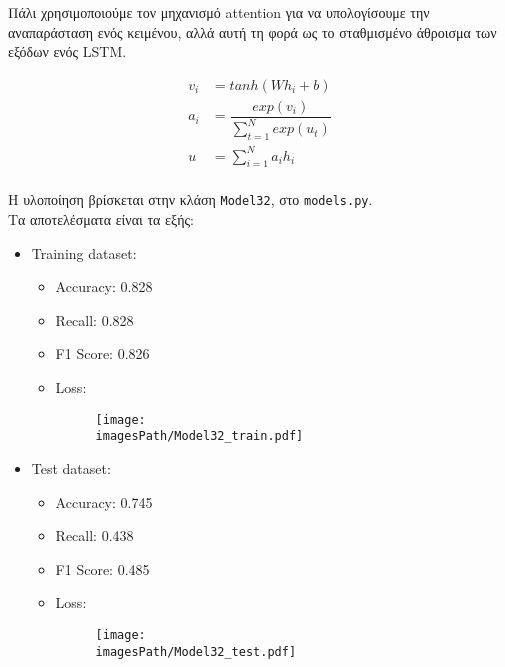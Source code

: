 \documentclass[a4paper, 12pt]{article}
\newcommand{\imagesPath}{results}
\newcommand{\myWidth}{0.8\linewidth}
\begin{document}
        Πάλι χρησιμοποιούμε τον μηχανισμό attention για να υπολογίσουμε την αναπαράσταση ενός κειμένου, αλλά αυτή τη φορά ως το σταθμισμένο άθροισμα των εξόδων ενός LSTM.
        
        \begin{align*}
            v_i &= tanh(Wh_i+b) \\
            a_i &= \dfrac{exp(v_i)}{\sum_{t=1}^{N}exp(u_t)}\\
            u   &= \sum_{i=1}^{N}a_ih_i\\
        \end{align*}
        
        Η υλοποίηση βρίσκεται στην κλάση \verb|Model32|, στο \verb|models.py|. \\

        Τα αποτελέσματα είναι τα εξής:
        
        \begin{itemize}
            \item Training dataset:
                \begin{itemize}
                    \item Accuracy: 0.828
                    \item Recall: 0.828
                    \item F1 Score: 0.826
                    \item Loss:
                        \begin{figure}[H]
                            \centering
                            \texttt{[image: \\imagesPath/Model32\_train.pdf]}
                        \end{figure}
                \end{itemize}
                
            \item Test dataset:
                \begin{itemize}
                    \item Accuracy: 0.745
                    \item Recall: 0.438
                    \item F1 Score: 0.485
                    \item Loss:
                        \begin{figure}[H]
                            \centering
                            \texttt{[image: \\imagesPath/Model32\_test.pdf]}
                        \end{figure}
                \end{itemize}
        \end{itemize}
\end{document}
